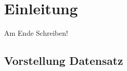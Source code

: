 \documentclass{report}
\begin{document}
\section{Einleitung}
Am Ende Schreiben!
\subsection{Vorstellung Datensatz}
\end{document}
